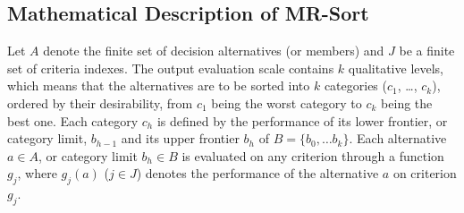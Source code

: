\renewcommand{\thesubsection}{\Alph{subsection}} %
\subsection{Mathematical Description of MR-Sort}\label{app:mrsort}

Let $A$ denote the finite set of decision alternatives (or members) and $J$ be a finite set of criteria indexes. The output 
evaluation scale contains $k$ qualitative levels, which means that the  alternatives are to be sorted into $k$ categories ($c_1$, \ldots, $c_k$), ordered by their desirability, from $c_1$ being the worst category to $c_k$ being the best one. Each category $c_h$ is defined by the performance of its lower frontier, or category limit, $b_{h-1}$ and its upper 
frontier $b_h$ of $B = \{b_0, \ldots b_{k}\}$. Each alternative $a\in A$, or category limit $b_h\in B$ is evaluated on any criterion through a function $g_j$, where $g_j(a)$ ($j\in J$) denotes the performance of the alternative $a$ on criterion $g_j$. 


